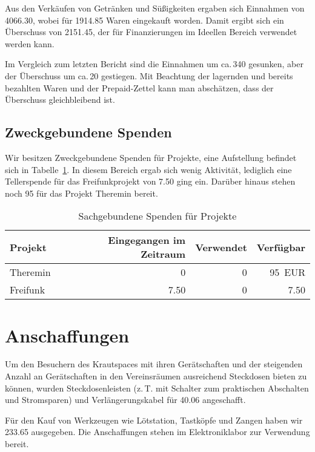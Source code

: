\documentclass[ngerman,10pt,DIV16]{scrartcl}
\begin{document}
Aus den Verkäufen  von Getränken und Süßigkeiten ergaben sich Einnahmen von \SI{4066,30}{\EUR}, wobei für \SI{1914,85}{\EUR} Waren eingekauft worden.
Damit ergibt sich ein Überschuss von \SI{2151,45}{\EUR}, der für Finanzierungen im Ideellen Bereich verwendet werden kann.

Im Vergleich zum letzten Bericht sind die Einnahmen um ca.\,\SI{340}{\EUR} gesunken, aber der Überschuss um ca.\,\SI{20}{\EUR} gestiegen.
Mit Beachtung der lagernden und bereits bezahlten Waren und der Prepaid-Zettel kann man abschätzen, dass der Überschuss gleichbleibend ist.

\subsection{Zweckgebundene Spenden}
\label{sec:zweckgebundene_spenden}

Wir besitzen Zweckgebundene Spenden für Projekte, eine Aufstellung befindet sich in Tabelle~\ref{table:spenden}.
In diesem Bereich ergab sich wenig Aktivität, lediglich eine Tellerspende für das Freifunkprojekt von \SI{7,50}{\EUR} ging ein. Darüber hinaus stehen noch \SI{95}{\EUR} für das Projekt Theremin bereit.

\begin{table}[h]
	\centering
	\begin{tabular}{l|r|r|r}
	\textbf{Projekt} & \textbf{Eingegangen im Zeitraum} & \textbf{Verwendet} & \textbf{Verfügbar} \\ \hline
	Theremin & \SI{0}{\EUR} & \SI{0}{\EUR} & \SI{95}{EUR} \\
	Freifunk & \SI{7,50}{\EUR} & \SI{0}{\EUR} & \SI{7,50}{\EUR} \\
	\end{tabular}
	\caption{Sachgebundene Spenden für Projekte}
	\label{table:spenden}
\end{table}

\section{Anschaffungen}
\label{sec:anschaffungen}
Um den Besuchern des Krautspaces mit ihren Gerätschaften und der steigenden Anzahl an Gerätschaften in den Vereinsräumen ausreichend Steckdosen bieten zu können, wurden Steckdosenleisten (z.\,T. mit Schalter zum praktischen Abschalten und Stromsparen) und Verlängerungskabel für \SI{40,06}{\EUR} angeschafft.

Für den Kauf von Werkzeugen wie Lötstation, Tastköpfe und Zangen haben wir \SI{233,65}{\EUR} ausgegeben.
Die Anschaffungen stehen im Elektroniklabor zur Verwendung bereit.
\end{document}
